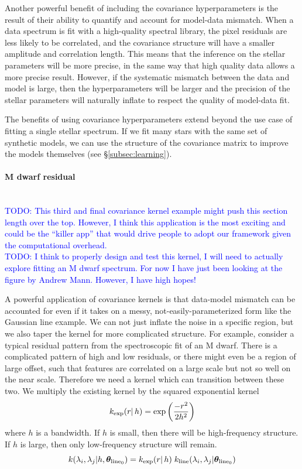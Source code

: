 \documentclass[preprint]{aastex} %
\newcommand{\vt}{ {\bm \theta}}
\newcommand{\vtline}[1]{\vt_{{\rm line}_{#1}}}
\newcommand{\todo}[1]{ \textcolor{Blue}{\\TODO: #1}}
\begin{document}
Another powerful benefit of including the covariance hyperparameters is the result of their ability to quantify and account for model-data mismatch. When a data spectrum is fit with a high-quality spectral library, the pixel residuals are less likely to be correlated, and the covariance structure will have a smaller amplitude and correlation length. This means that the inference on the stellar parameters will be more precise, in the same way that high quality data allows a more precise result. However, if the systematic mismatch between the data and model is large, then the hyperparameters will be larger and the precision of the stellar parameters will naturally inflate to respect the quality of model-data fit.

The benefits of using covariance hyperparameters extend beyond the use case of fitting a single stellar spectrum. If we fit many stars with the same set of synthetic models, we can use the structure of the covariance matrix to improve the models themselves (see \S\ref{subsec:learning}).

\paragraph{M dwarf residual}
\todo{This third and final covariance kernel example might push this section length over the top. However, I think this application is the most exciting and could be the ``killer app'' that would drive people to adopt our framework given the computational overhead.} 
\todo{I think to properly design and test this kernel, I will need to actually explore fitting an M dwarf spectrum. For now I have just been looking at the figure by Andrew Mann. However, I have high hopes!}

A powerful application of covariance kernels is that data-model mismatch can be accounted for even if it takes on a messy, not-easily-parameterized form like the Gaussian line example. We can not just inflate the noise in a specific region, but we also taper the kernel for more complicated structure. For example, consider a typical residual pattern from the spectroscopic fit of an M dwarf. There is a complicated pattern of high and low residuals, or there might even be a region of large offset, such that features are correlated on a large scale but not so well on the near scale. Therefore we need a kernel which can transition between these two. We multiply the existing kernel by the squared exponential kernel 
\begin{equation}
  k_{ \rm exp}(r |\, h) = \exp \left ( \frac{- r^2 }{2 h^2} \right )
\end{equation}
where $h$ is a bandwidth. If $h$ is small, then there will be high-frequency
structure. If $h$ is large, then only low-frequency structure will remain. 
\begin{equation}
  k(\lambda_i, \lambda_j | h, \vtline{0}) = 
   k_{\rm exp}(r |\, h) \; 
   k_{\rm line}(\lambda_i, \lambda_j | \vtline{0})
\end{equation}
\end{document}
